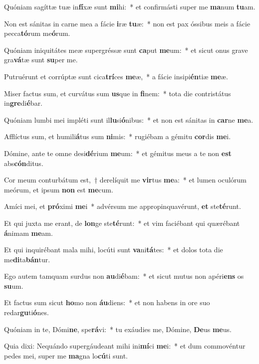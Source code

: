 \item Quóniam sagíttæ tuæ in\textbf{fí}xæ sunt \textbf{mi}hi:~* et confirmásti super me \textbf{ma}num \textbf{tu}am.
\item Non est sánitas in carne mea a fácie \textbf{i}ræ \textbf{tu}æ:~* non est pax óssibus meis a fácie pecca\textbf{tó}rum me\textbf{ó}rum.
\item Quóniam iniquitátes meæ supergréssæ sunt \textbf{ca}put \textbf{me}um:~* et sicut onus grave gra\textbf{vá}tæ sunt \textbf{su}per me.
\item Putruérunt et corrúptæ sunt cica\textbf{trí}ces \textbf{me}æ,~* a fácie insipi\textbf{én}tiæ \textbf{me}æ.
\item Miser factus sum, et curvátus sum \textbf{us}que in \textbf{fi}nem:~* tota die contristátus in\textbf{gre}di\textbf{é}bar.
\item Quóniam lumbi mei impléti sunt il\textbf{lu}si\textbf{ó}nibus:~* et non est sánitas in \textbf{car}ne \textbf{me}a.
\item Afflíctus sum, et humili\textbf{á}tus sum \textbf{ni}mis:~* rugiébam a gémitu \textbf{cor}dis \textbf{me}i.
\item Dómine, ante te omne desi\textbf{dé}rium \textbf{me}um:~* et gémitus meus a te non \textbf{est} abs\textbf{cón}ditus.
\item Cor meum conturbátum est,~† derelíquit me \textbf{vir}tus \textbf{me}a:~* et lumen oculórum meórum, et ipsum \textbf{non} est \textbf{me}cum.
\item Amíci mei, et \textbf{pró}ximi \textbf{me}i~* advérsum me appropinquavérunt, \textbf{et} ste\textbf{té}runt.
\item Et qui juxta me erant, de \textbf{lon}ge ste\textbf{té}runt:~* et vim faciébant qui quærébant \textbf{á}nimam \textbf{me}am.
\item Et qui inquirébant mala mihi, locúti sunt \textbf{va}ni\textbf{tá}tes:~* et dolos tota die me\textbf{di}ta\textbf{bán}tur.
\item Ego autem tamquam surdus non \textbf{au}di\textbf{é}bam:~* et sicut mutus non apéri\textbf{ens} os \textbf{su}um.
\item Et factus sum sicut \textbf{ho}mo non \textbf{áu}diens:~* et non habens in ore suo redar\textbf{gu}ti\textbf{ó}nes.
\item Quóniam in te, Dómi\textbf{ne}, spe\textbf{rá}vi:~* tu exáudies me, Dómine, \textbf{De}us \textbf{me}us.
\item Quia dixi: Nequándo supergáudeant mihi ini\textbf{mí}ci \textbf{me}i:~* et dum commovéntur pedes mei, super me \textbf{ma}gna lo\textbf{cú}ti sunt.
